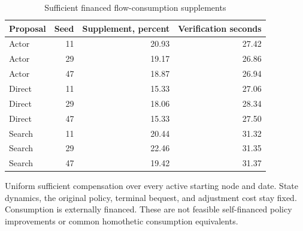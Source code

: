 \begin{table}[htbp]
\centering\small\setlength{\tabcolsep}{4pt}
\caption{Sufficient financed flow-consumption supplements}\label{tab:r9welfare}
\begin{tabular}{lrrr}
\toprule
Proposal & Seed & Supplement, percent & Verification seconds \\
\midrule
Actor & 11 & 20.93 & 27.42 \\
Actor & 29 & 19.17 & 26.86 \\
Actor & 47 & 18.87 & 26.94 \\
Direct & 11 & 15.33 & 27.06 \\
Direct & 29 & 18.06 & 28.34 \\
Direct & 47 & 15.33 & 27.50 \\
Search & 11 & 20.44 & 31.32 \\
Search & 29 & 22.46 & 31.35 \\
Search & 47 & 19.42 & 31.37 \\
\bottomrule
\end{tabular}
\par\vspace{3pt}\begin{minipage}{0.97\linewidth}\footnotesize Uniform sufficient compensation over every active starting node and date. State dynamics, the original policy, terminal bequest, and adjustment cost stay fixed. Consumption is externally financed. These are not feasible self-financed policy improvements or common homothetic consumption equivalents.\end{minipage}
\end{table}
